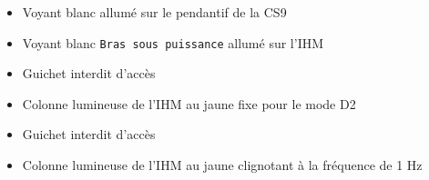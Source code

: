 \begin{UPSTIManipulation}[Modes D1 et D2]
\end{UPSTIManipulation}

\begin{UPSTIVerification}[Mode D1 et D2]
    \begin{itemize}[label=$\square$]
        \item Voyant blanc allumé sur le pendantif de la CS9
        \item Voyant blanc \texttt{Bras sous puissance} allumé sur l'IHM
        \item Guichet interdit d'accès
        \item Colonne lumineuse de l'IHM au jaune fixe pour le mode D2
    \end{itemize}
\end{UPSTIVerification}

\begin{UPSTIManipulation}[Modes A5]
\end{UPSTIManipulation}

\begin{UPSTIVerification}[Mode A5]
    \begin{itemize}[label=$\square$]
        \item Guichet interdit d'accès
        \item Colonne lumineuse de l'IHM au jaune clignotant à la fréquence de 1 Hz
    \end{itemize}
\end{UPSTIVerification}

\begin{UPSTIManipulation}[Modes A6]
\end{UPSTIManipulation}

\begin{UPSTIVerification}[Mode A6]
\end{UPSTIVerification}

\begin{UPSTIManipulation}[Mode A1]
\end{UPSTIManipulation}